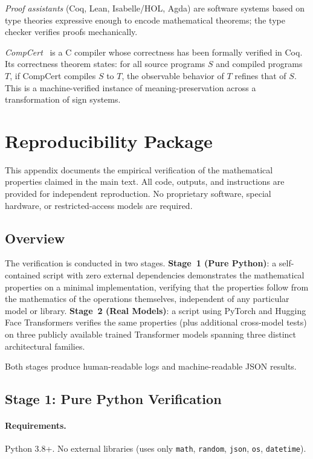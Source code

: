 \documentclass[a4paper,twocolumn,11pt]{article}
\begin{document}
\emph{Proof assistants} (Coq, Lean, Isabelle/HOL, Agda) are software systems based on type theories expressive enough to encode mathematical theorems; the type checker verifies proofs mechanically.

\emph{CompCert}~\cite{Leroy2009} is a C compiler whose correctness has been formally verified in Coq. Its correctness theorem states: for all source programs $S$ and compiled programs $T$, if CompCert compiles $S$ to $T$, the observable behavior of $T$ refines that of $S$. This is a machine-verified instance of meaning-preservation across a transformation of sign systems.

\clearpage

\section{Reproducibility Package}
\label{app:reproducibility}

This appendix documents the empirical verification of the mathematical properties claimed in the main text. All code, outputs, and instructions are provided for independent reproduction. No proprietary software, special hardware, or restricted-access models are required.

\subsection{Overview}
\label{sec:B1}

The verification is conducted in two stages. \textbf{Stage~1 (Pure Python)}: a self-contained script with zero external dependencies demonstrates the mathematical properties on a minimal implementation, verifying that the properties follow from the mathematics of the operations themselves, independent of any particular model or library. \textbf{Stage~2 (Real Models)}: a script using PyTorch and Hugging Face Transformers verifies the same properties (plus additional cross-model tests) on three publicly available trained Transformer models spanning three distinct architectural families.

Both stages produce human-readable logs and machine-readable JSON results.

\subsection{Stage 1: Pure Python Verification}
\label{sec:B2}

\paragraph{Requirements.}  Python 3.8+. No external libraries (uses only \texttt{math}, \texttt{random}, \texttt{json}, \texttt{os}, \texttt{datetime}).
\end{document}
